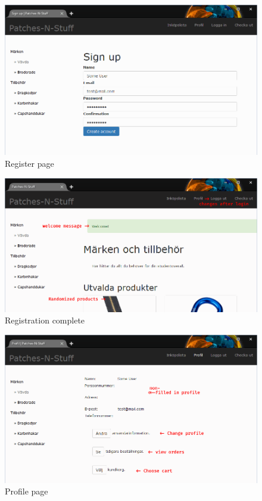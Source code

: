 \documentclass[paper=a4, fontsize=11pt]{report} %
\begin{document}
\begin{itemize}
\begin{figure}
	\includegraphics[width=0.9\paperwidth]{artifacts/stories/3_register.png}
	\caption{Register page}
	\label{fig:register}
\end{figure}

\begin{figure}
	\includegraphics[width=0.9\paperwidth]{artifacts/stories/4_register_done.png}
	\caption{Registration complete}
	\label{fig:register_done}
\end{figure}

\begin{figure}
	\includegraphics[width=0.9\paperwidth]{artifacts/stories/5_profile.png}
	\caption{Profile page}
	\label{fig:profile}
\end{figure}


\end{itemize}
\end{document}
